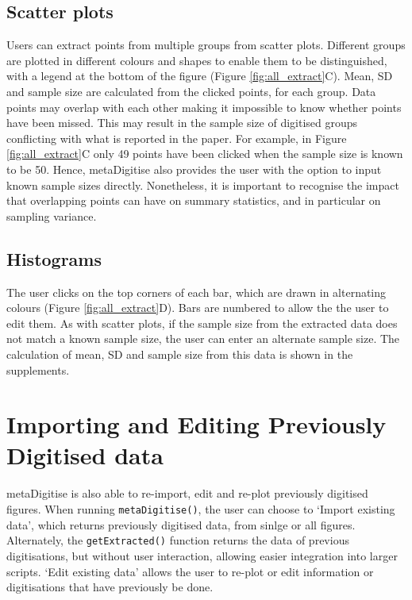 \documentclass[12pt]{article}
\newcommand{\fct}[1]{\texttt{#1()}}
\newcommand{\pkg}[1]{{\fontseries{b}\selectfont #1}}
\begin{document}
\subsection{Scatter plots}
Users can extract points from multiple groups from scatter plots. Different groups are plotted in different colours and shapes to enable them to be distinguished, with a legend at the bottom of the figure (Figure \ref{fig:all_extract}C). Mean, SD and sample size are calculated from the clicked points, for each group. Data points may overlap with each other making it impossible to know whether points have been missed. This may result in the sample size of digitised groups conflicting with what is reported in the paper. For example, in Figure \ref{fig:all_extract}C only 49 points have been clicked when the sample size is known to be 50. Hence, \pkg{metaDigitise} also provides the user with the option to input known sample sizes directly. Nonetheless, it is important to recognise the impact that overlapping points can have on summary statistics, and in particular on sampling variance.

\subsection{Histograms}
The user clicks on the top corners of each bar, which are drawn in alternating colours (Figure \ref{fig:all_extract}D). Bars are numbered to allow the the user to edit them. As with scatter plots, if the sample size from the extracted data does not match a known sample size, the user can enter an alternate sample size. The calculation of mean, SD and sample size from this data is shown in the supplements.




\section{Importing and Editing Previously Digitised data}
\pkg{metaDigitise} is also able to re-import, edit and re-plot previously digitised figures. When running \fct{metaDigitise}, the user can choose to `Import existing data', which returns previously digitised data, from sinlge or all figures. Alternately, the \fct{getExtracted} function returns the data of previous digitisations, but without user interaction, allowing easier integration into larger scripts. `Edit existing data' allows the user to re-plot or edit information or digitisations that have previously be done.
\end{document}
